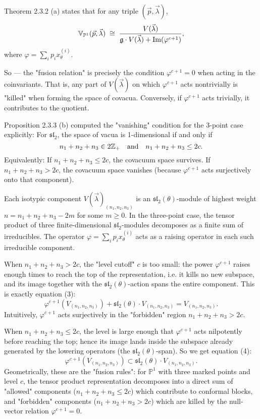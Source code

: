 \documentclass[12pt]{article}
\begin{document}
\begin{remark}
     Theorem 2.3.2 (a) states that for any triple $(\vec{p}, \vec{\lambda})$,
    \[
    \mathbb{V}_{\P^1}(\vec p,\vec\lambda) \;\cong\;
    \frac{V(\vec\lambda)}{\mathfrak{g}\cdot V(\vec\lambda) + \operatorname{Im}(\varphi^{c+1})},
    \]
    where $\varphi = \sum_i p_i x_\theta^{(i)}$.

    So — the "fusion relation" is precisely the condition $\varphi^{c+1} = 0$ when acting in the coinvariants. That is, any part of $V(\vec\lambda)$ on which $\varphi^{c+1}$ acts nontrivially is "killed" when forming the space of covacua. Conversely, if $\varphi^{c+1}$ acts trivially, it contributes to the quotient.

    Proposition 2.3.3 (b) computed the "vanishing" condition for the 3-point case explicitly: For $\mathfrak{sl}_2$, the space of vacua is 1-dimensional if and only if
    \[
    n_1 + n_2 + n_3 \in 2\Z_+ \quad \text{and} \quad n_1+n_2+n_3 \le 2c.
    \]
    Equivalently:
    If $n_1 + n_2 + n_3 \le 2c$, the covacuum space survives.
    If $n_1 + n_2 + n_3 > 2c$, the covacuum space vanishes (because $\varphi^{c+1}$ acts surjectively onto that component).

    Each isotypic component $V(\vec\lambda)_{(n_1,n_2,n_3)}$ is an $\mathfrak{sl}_2(\theta)$-module of highest weight $n = n_1+n_2+n_3 - 2m$ for some $m\ge 0$. In the three-point case, the tensor product of three finite-dimensional $\mathfrak{sl}_2$-modules decomposes as a finite sum of irreducibles. The operator $\varphi = \sum_i p_i x_\theta^{(i)}$ acts as a raising operator in each such irreducible component.

    When $n_1+n_2+n_3 > 2c$, the "level cutoff" $c$ is too small: the power $\varphi^{c+1}$ raises enough times to reach the top of the representation, i.e. it kills no new subspace, and its image together with the $\mathfrak{sl}_2(\theta)$-action spans the entire component. This is exactly equation (3):
    \[
    \varphi^{c+1}(V_{(n_1,n_2,n_3)}) + \mathfrak{sl}_2(\theta)\cdot V_{(n_1,n_2,n_3)}
    = V_{(n_1,n_2,n_3)}.
    \]
    Intuitively, $\varphi^{c+1}$ acts surjectively in the "forbidden" region $n_1+n_2+n_3>2c$.

    When $n_1+n_2+n_3 \le 2c$, the level is large enough that $\varphi^{c+1}$ acts nilpotently before reaching the top; hence its image lands inside the subspace already generated by the lowering operators (the $\mathfrak{sl}_2(\theta)$-span). So we get equation (4):
    \[
    \varphi^{c+1}(V_{(n_1,n_2,n_3)}) \subset \mathfrak{sl}_2(\theta)\cdot V_{(n_1,n_2,n_3)}.
    \]
    Geometrically, these are the "fusion rules": for $\mathbb{P}^1$ with three marked points and level $c$, the tensor product representation decomposes into a direct sum of "allowed" components ($n_1+n_2+n_3\leq 2c$) which contribute to conformal blocks, and "forbidden" components ($n_1+n_2+n_3>2c$) which are killed by the null-vector relation $\varphi^{c+1}=0$.
\end{remark}
\end{document}
